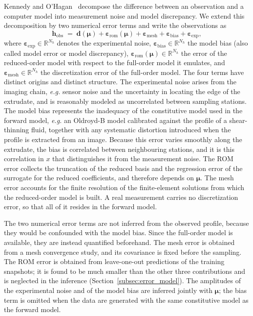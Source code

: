 \documentclass{elsarticle}
\newcommand{\eg}{\emph{e.g.}\xspace}
\renewcommand{\vec}[1]{\boldsymbol{#1}}
\newcommand{\params}{\boldsymbol{\mu}}
\newcommand{\subexp}{\mathrm{exp}}
\newcommand{\subbias}{\mathrm{bias}}
\newcommand{\submesh}{\mathrm{mesh}}        %
\newcommand{\obs}{\mathrm{obs}}
\newcommand{\rom}{\mathrm{rom}}
\begin{document}
Kennedy and O'Hagan~\cite{kennedy2001calibration} decompose the difference
between an observation and a computer model into measurement noise and model
discrepancy. We extend this decomposition by two numerical error terms and
write the observations as
\begin{equation}
\vec{h}_{\obs}
\;=\;
\vec{d}(\params)
+
\vec{\varepsilon}_{\rom}(\params)
+
\vec{\varepsilon}_{\submesh}
+
\vec{\varepsilon}_{\subbias}
+
\vec{\varepsilon}_{\subexp},
\label{eq:error_decomposition}
\end{equation}
where $\vec{\varepsilon}_{\subexp} \in \mathbb{R}^{N_h}$ denotes the
experimental noise, $\vec{\varepsilon}_{\subbias} \in \mathbb{R}^{N_h}$ the
model bias (also called model error or model discrepancy),
$\vec{\varepsilon}_{\rom}(\params) \in \mathbb{R}^{N_h}$ the error of the
reduced-order model with respect to the full-order model it emulates, and
$\vec{\varepsilon}_{\submesh} \in \mathbb{R}^{N_h}$ the discretization error of
the full-order model. The four terms have distinct origins and distinct
structure. The experimental noise arises from the imaging chain, \eg sensor
noise and the uncertainty in locating the edge of the extrudate, and is
reasonably modeled as uncorrelated between sampling stations. The model bias
represents the inadequacy of the constitutive model used in the forward model,
\eg an Oldroyd-B model calibrated against the profile of a shear-thinning
fluid, together with any systematic distortion introduced when the profile is
extracted from an image. Because this error varies smoothly along the
extrudate, the bias is correlated between neighbouring stations, and it is this
correlation in $x$ that distinguishes it from the measurement noise. The ROM
error collects the truncation of the reduced basis and the regression error of
the surrogate for the reduced coefficients, and therefore depends on $\params$.
The mesh error accounts for the finite resolution of the finite-element
solutions from which the reduced-order model is built. A real measurement
carries no discretization error, so that all of it resides in the forward model.

The two numerical error terms are not inferred from the observed profile,
because they would be confounded with the model bias. Since the full-order
model is available, they are instead quantified beforehand. The mesh error is
obtained from a mesh convergence study, and its covariance is fixed before the
sampling. The ROM error is obtained from leave-one-out predictions of the
training snapshots; it is found to be much smaller than the other three
contributions and is neglected in the inference
(Section~\ref{subsec:error_model}). The amplitudes of the experimental noise and
of the model bias are inferred jointly with $\params$; the bias term is omitted
when the data are generated with the same constitutive model as the forward
model.
\end{document}
